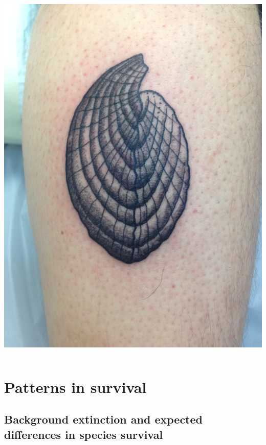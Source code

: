 \documentclass{beamer}
\begin{document}
\begin{frame}
\begin{columns}
\begin{column}{0.5\textwidth}
\begin{center}
        \vspace{0.5cm}

        \includegraphics[height = 0.6\textheight, keepaspectratio = true]{figure/tattoo}
      \end{center}
    \end{column}
  \end{columns}
\end{frame}

\begingroup
\AtBeginSection{}
\section{Patterns in survival}
\endgroup
\subsection{Background extinction and expected differences in species survival}
\end{document}
